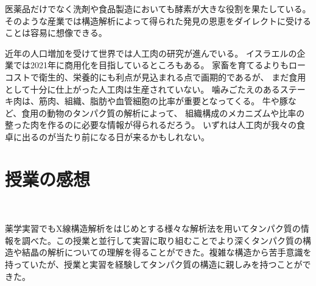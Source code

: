 \documentclass[a4paper,papersize,dvipdfmx]{jsarticle}
\begin{document}
医薬品だけでなく洗剤や食品製造においても酵素が大きな役割を果たしている。そのような産業では構造解析によって得られた発見の恩恵をダイレクトに受けることは容易に想像できる。

近年の人口増加を受けて世界では人工肉の研究が進んでいる。
イスラエルの企業では2021年に商用化を目指しているところもある。
家畜を育てるよりもローコストで衛生的、栄養的にも利点が見込まれる点で画期的であるが、
まだ食用として十分に仕上がった人工肉は生産されていない。
噛みごたえのあるステーキ肉は、筋肉、組織、脂肪や血管細胞の比率が重要となってくる。
牛や豚など、食用の動物のタンパク質の解析によって、
組織構成のメカニズムや比率の整った肉を作るのに必要な情報が得られるだろう。
いずれは人工肉が我々の食卓に出るのが当たり前になる日が来るかもしれない。

\vspace*{40pt}

\section*{授業の感想}

\

薬学実習でもX線構造解析をはじめとする様々な解析法を用いてタンパク質の情報を調べた。この授業と並行して実習に取り組むことでより深くタンパク質の構造や結晶の解析についての理解を得ることができた。複雑な構造から苦手意識を持っていたが、授業と実習を経験してタンパク質の構造に親しみを持つことができた。
\end{document}
